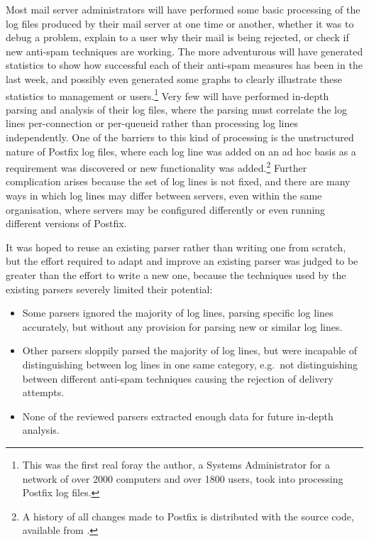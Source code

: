 Most mail server administrators will have performed some basic processing
of the log files produced by their mail server at one time or another,
whether it was to debug a problem, explain to a user why their mail is
being rejected, or check if new anti-spam techniques are working.  The more
adventurous will have generated statistics to show how successful each of
their anti-spam measures has been in the last week, and possibly even
generated some graphs to clearly illustrate these statistics to management
or users.\footnote{This was the first real foray the author, a Systems
Administrator for a network of over 2000 computers and over 1800 users,
took into processing Postfix log files.}  Very few will have performed
in-depth parsing and analysis of their log files, where the parsing must
correlate the log lines per-connection or per-queueid rather than
processing log lines independently.  One of the barriers to this kind of
processing is the unstructured nature of Postfix log files, where each log
line was added on an ad hoc basis as a requirement was discovered or new
functionality was added.\footnote{A history of all changes made to Postfix
is distributed with the source code, available from
.}  Further
complication arises because the set of log lines is not fixed, and there
are many ways in which log lines may differ between servers, even within
the same organisation, where servers may be configured differently or even
running different versions of Postfix.

It was hoped to reuse an existing parser rather than writing one from
scratch, but the effort required to adapt and improve an existing parser
was judged to be greater than the effort to write a new one, because the
techniques used by the existing parsers severely limited their potential:

\begin{itemize}

    \item Some parsers ignored the majority of log lines, parsing specific
        log lines accurately, but without any provision for parsing new or
        similar log lines.

    \item Other parsers sloppily parsed the majority of log lines, but were
        incapable of distinguishing between log lines in one same category,
        e.g.\ not distinguishing between different anti-spam techniques
        causing the rejection of delivery attempts.

    \item None of the reviewed parsers extracted enough data for future
        in-depth analysis.

\end{itemize}

